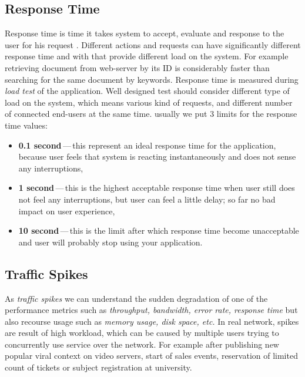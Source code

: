 \subsection{Response Time}
\label{Response Time 1}
Response time is time it takes system to accept, evaluate and response to the user for his request . Different actions and requests can have significantly different response time and with that provide different load on the system. For example retrieving document from web-server by its ID is considerably faster than searching for the same document by keywords. Response time is measured during \emph{load test} \cite{Manzor:APTB} of the application. Well designed test should consider different type of load on the system, which means various kind of requests, and different 
number of connected end-users at the same time. usually we put 3 limits for the response time values: 

\begin{itemize}
	\setlength\itemsep{0em}
	\item \textbf{0.1 second}\,---\,this represent an ideal response time for the application, because user feels that system is reacting instantaneously and does not sense any interruptions,
	\item \textbf{1 second}\,---\,this is the highest acceptable response time when user still does not feel any interruptions, but user can feel a little delay; so far no bad impact on user experience,
	\item \textbf{10 second}\,---\,this is the limit after which response time become unacceptable and user will probably stop using your application.
\end{itemize}


\subsection{Traffic Spikes}
As \emph{traffic spikes} \cite{Kurkova:Thesis:2017, AMC:SPIKES} we can understand the sudden degradation of one of the performance metrics such as \emph{throughput, bandwidth, error rate, response time} but also recourse usage such as \emph{memory usage, disk space, etc.} In real network, spikes are result of high workload, which can be caused by multiple users trying to concurrently use service over the network. For example after publishing new popular viral context on video servers, start of sales events, reservation of limited count of tickets or subject registration at university.

